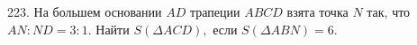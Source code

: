 223. На большем основании $AD$ трапеции $ABCD$ взята точка $N$ так, что $AN:ND=3:1.$ Найти $S(\Delta ACD),$ если $S(\Delta ABN)=6.$\\
